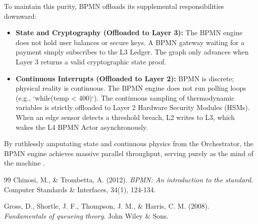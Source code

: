 To maintain this purity, BPMN offloads its supplemental responsibilities downward:
\begin{itemize}
    \item \textbf{State and Cryptography (Offloaded to Layer 3):} The BPMN engine does not hold user balances or secure keys. A BPMN gateway waiting for a payment simply subscribes to the L3 Ledger. The graph only advances when Layer 3 returns a valid cryptographic state proof.
    \item \textbf{Continuous Interrupts (Offloaded to Layer 2):} BPMN is discrete; physical reality is continuous. The BPMN engine does not run polling loops (e.g., `while(temp < 400)`). The continuous sampling of thermodynamic variables is strictly offloaded to Layer 2 Hardware Security Modules (HSMs). When an edge sensor detects a threshold breach, L2 writes to L3, which wakes the L4 BPMN Actor asynchronously.
\end{itemize}
By ruthlessly amputating state and continuous physics from the Orchestrator, the BPMN engine achieves massive parallel throughput, serving purely as the mind of the machine \cite{gross2008fundamentals}.

\vspace{1cm}
\begin{thebibliography}{99}
Chinosi, M., \& Trombetta, A. (2012). \textit{BPMN: An introduction to the standard}. Computer Standards \& Interfaces, 34(1), 124-134.

Gross, D., Shortle, J. F., Thompson, J. M., \& Harris, C. M. (2008). \textit{Fundamentals of queueing theory}. John Wiley \& Sons.
\end{thebibliography}
